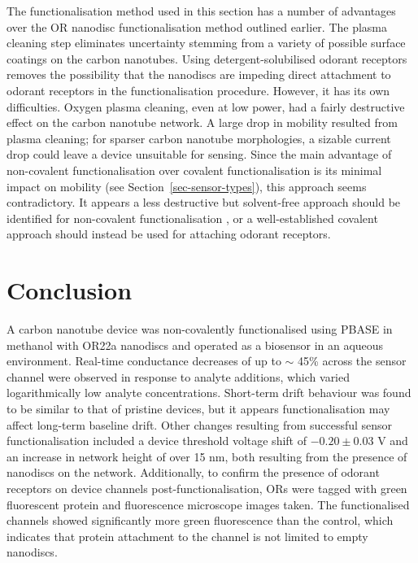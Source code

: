 \documentclass[
  a4paper,
]{scrbook}
\begin{document}
The functionalisation method used in this section has a number of
advantages over the OR nanodisc functionalisation method outlined
earlier. The plasma cleaning step eliminates uncertainty stemming from a
variety of possible surface coatings on the carbon nanotubes. Using
detergent-solubilised odorant receptors removes the possibility that the
nanodiscs are impeding direct attachment to odorant receptors in the
functionalisation procedure. However, it has its own difficulties.
Oxygen plasma cleaning, even at low power, had a fairly destructive
effect on the carbon nanotube network. A large drop in mobility resulted
from plasma cleaning; for sparser carbon nanotube morphologies, a
sizable current drop could leave a device unsuitable for sensing. Since
the main advantage of non-covalent functionalisation over covalent
functionalisation is its minimal impact on mobility (see
Section~\ref{sec-sensor-types}), this approach seems contradictory. It
appears a less destructive but solvent-free approach should be
identified for non-covalent functionalisation \autocite{Ashraf2014}, or
a well-established covalent approach should instead be used for
attaching odorant receptors.

\hypertarget{conclusion-1}{%
\section{Conclusion}\label{conclusion-1}}

A carbon nanotube device was non-covalently functionalised using PBASE
in methanol with OR22a nanodiscs and operated as a biosensor in an
aqueous environment. Real-time conductance decreases of up to \(\sim\)
45\% across the sensor channel were observed in response to analyte
additions, which varied logarithmically low analyte concentrations.
Short-term drift behaviour was found to be similar to that of pristine
devices, but it appears functionalisation may affect long-term baseline
drift. Other changes resulting from successful sensor functionalisation
included a device threshold voltage shift of \(-0.20\pm0.03\) V and an
increase in network height of over 15 nm, both resulting from the
presence of nanodiscs on the network. Additionally, to confirm the
presence of odorant receptors on device channels post-functionalisation,
ORs were tagged with green fluorescent protein and fluorescence
microscope images taken. The functionalised channels showed
significantly more green fluorescence than the control, which indicates
that protein attachment to the channel is not limited to empty
nanodiscs.
\end{document}

